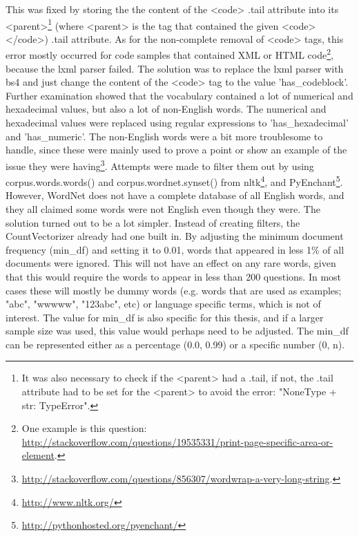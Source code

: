 This was fixed by storing the the content of the <code> .tail attribute into its <parent>\footnote{
	It was also necessary to check if the <parent> had a .tail, if not, the .tail attribute had to be set for the <parent> to avoid the error: 
	"NoneType + str: TypeError".
	} 
(where <parent> is the tag that contained the given <code></code>) .tail attribute. 
As for the non-complete removal of <code> tags, this error mostly occurred for code samples that contained XML or HTML code\footnote{
	One example is this question: \\
	\url{http://stackoverflow.com/questions/19535331/print-page-specific-area-or-element}.
	}, 
because the lxml parser failed. 
The solution was to replace the lxml parser with bs4 and just change the content of the <code> tag to the value 'has\_codeblock'.
\vspace{0.5em}\newline
Further examination showed that the vocabulary contained a lot of numerical and hexadecimal values, but also a lot of non-English words. 
The numerical and hexadecimal values were replaced using regular expressions to 'has\_hexadecimal' and 'has\_numeric'. 
The non-English words were a bit more troublesome to handle, since these were mainly used to prove a point or show an example of the issue they were having\footnote{ 
	\url{http://stackoverflow.com/questions/856307/wordwrap-a-very-long-string}.
	}. 
Attempts were made to filter them out by using corpus.words.words() and corpus.wordnet.synset() 
from \gls{nltk}\footnote{\url{http://www.nltk.org/}}, and PyEnchant\footnote{\url{http://pythonhosted.org/pyenchant/}}. 
However, WordNet does not have a complete database of all English words, and they all claimed some words were not English even though they were.
\vspace{0.5em}\newline
The solution turned out to be a lot simpler. 
Instead of creating filters, the CountVectorizer already had one built in. 
By adjusting the minimum document frequency (min\_df) and setting it to 0.01, words that appeared in less 1\% of all documents were ignored.
This will not have an effect on any rare words, given that this would require the words to appear in less than 200 questions. 
In most cases these will mostly be dummy words (e.g. words that are used as examples; "abc", "wwwww", "123abc", etc) or language specific terms, which is not of interest.
The value for min\_df is also specific for this thesis, and if a larger sample size was used, this value would perhaps need to be adjusted. 
The min\_df can be represented either as a percentage (0.0, 0.99) or a specific number (0, n).


